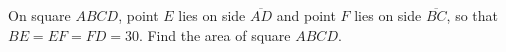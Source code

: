 On square $ABCD$, point $E$ lies on side $\overline{AD}$ and point $F$ lies on side $\overline{BC}$, so that $BE=EF=FD=30$. Find the area of square $ABCD$.